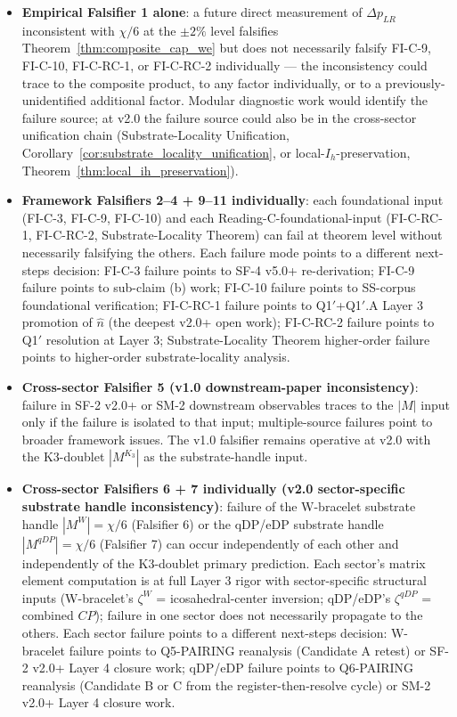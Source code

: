 \documentclass[11pt,letterpaper]{article}
\newcommand{\Kthree}{\ensuremath{K_3}}
\newcommand{\DeltapLR}{\Delta p_{LR}}
\begin{document}
\begin{itemize}\setlength\itemsep{0.3em}
    \item \textbf{Empirical Falsifier 1 alone}: a future direct measurement of $\DeltapLR$ inconsistent with $\chi/6$ at the $\pm 2\%$ level falsifies Theorem~\ref{thm:composite_cap_we} but does not necessarily falsify FI-C-9, FI-C-10, FI-C-RC-1, or FI-C-RC-2 individually --- the inconsistency could trace to the composite product, to any factor individually, or to a previously-unidentified additional factor. Modular diagnostic work would identify the failure source; at v2.0 the failure source could also be in the cross-sector unification chain (Substrate-Locality Unification, Corollary~\ref{cor:substrate_locality_unification}, or local-$I_h$-preservation, Theorem~\ref{thm:local_ih_preservation}).
    \item \textbf{Framework Falsifiers 2--4 + 9--11 individually}: each foundational input (FI-C-3, FI-C-9, FI-C-10) and each Reading-C-foundational-input (FI-C-RC-1, FI-C-RC-2, Substrate-Locality Theorem) can fail at theorem level without necessarily falsifying the others. Each failure mode points to a different next-steps decision: FI-C-3 failure points to SF-4 v5.0+ re-derivation; FI-C-9 failure points to sub-claim (b) work; FI-C-10 failure points to SS-corpus foundational verification; FI-C-RC-1 failure points to Q1$'$+Q1$'$.A Layer 3 promotion of $\hat{n}$ (the deepest v2.0+ open work); FI-C-RC-2 failure points to Q1$'$ resolution at Layer 3; Substrate-Locality Theorem higher-order failure points to higher-order substrate-locality analysis.
    \item \textbf{Cross-sector Falsifier 5 (v1.0 downstream-paper inconsistency)}: failure in SF-2 v2.0+ or SM-2 downstream observables traces to the $|M|$ input only if the failure is isolated to that input; multiple-source failures point to broader framework issues. The v1.0 falsifier remains operative at v2.0 with the K3-doublet $|M^{\Kthree}|$ as the substrate-handle input.
    \item \textbf{Cross-sector Falsifiers 6 + 7 individually (v2.0 sector-specific substrate handle inconsistency)}: failure of the W-bracelet substrate handle $|M^W| = \chi/6$ (Falsifier 6) or the qDP/eDP substrate handle $|M^{qDP}| = \chi/6$ (Falsifier 7) can occur independently of each other and independently of the K3-doublet primary prediction. Each sector's matrix element computation is at full Layer 3 rigor with sector-specific structural inputs (W-bracelet's $\zeta^W$ = icosahedral-center inversion; qDP/eDP's $\zeta^{qDP}$ = combined $CP$); failure in one sector does not necessarily propagate to the others. Each sector failure points to a different next-steps decision: W-bracelet failure points to Q5-PAIRING reanalysis (Candidate A retest) or SF-2 v2.0+ Layer 4 closure work; qDP/eDP failure points to Q6-PAIRING reanalysis (Candidate B or C from the register-then-resolve cycle) or SM-2 v2.0+ Layer 4 closure work.

\end{itemize}
\end{document}

